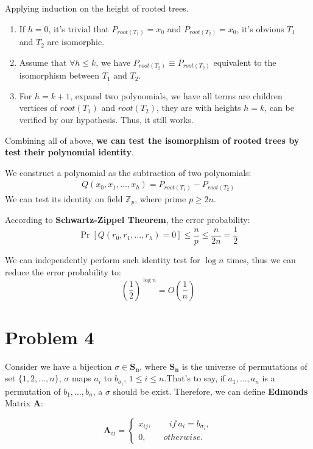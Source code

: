 \documentclass[a4paper, 12pt, titlepage]{article}
\begin{document}
Applying induction on the height of rooted trees.
\begin{enumerate}[1]
    \item If $h = 0$, it's trivial that $P_{root(T_{1})} = x_{0}$ and $P_{root(T_{2})} = x_{0}$, it's obvious $T_{1}$ and $T_{2}$ are isomorphic.
    \item Assume that $\forall h \leq k$, we have $P_{root(T_{2})} \equiv P_{root(T_{2})}$ equivalent to the isomorphism between $T_{1}$ and $T_{2}$.
    \item For $h = k + 1$, expand two polynomials, we have all terms are children vertices of $root(T_{1})$ and $root(T_{2})$, they are with heights $h = k$, can be verified by our hypothesis.
          Thus, it still works.
\end{enumerate}
Combining all of above, \textbf{we can test the isomorphism of rooted trees by test their polynomial identity}. 

We construct a polynomial as the subtraction of two polynomials:
\begin{equation}
    \begin{aligned}
        Q \left(x_{0}, x_{1}, \ldots, x_{h} \right) = P_{root(T_{1})} - P_{root(T_{2})}
    \end{aligned}
\end{equation}
We can test its identity on field $\mathbb{Z}_{p}$, where prime $p \geq 2n$.

According to \textbf{Schwartz-Zippel Theorem}, the error probability:
\[
    \Pr \left[ Q(r_{0}, r_{1}, \ldots, r_{h}) = 0 \right] \leq \frac{n}{p} \leq \frac{n}{2n} = \frac{1}{2}
\]        

We can independently perform such identity test for $\log{n}$ times, thus we can reduce the error probability to:
\[
    \left( \frac{1}{2} \right)^{\log{n}} = O \left( \frac{1}{n} \right)
\]

\section{Problem 4}
Consider we have a bijection $\sigma \in \mathbf{S_{n}}$, where $\mathbf{S_{n}}$ is the universe of permutations of set $\{1,2, \ldots, n\}$,
$\sigma$ maps $a_{i}$ to $b_{\sigma_{i}}$, $1 \leq i \leq n$.That's to say, if $a_{1}, \ldots, a_{n}$ is a permutation of 
$b_{1}, \ldots, b_{n}$, a $\sigma$ should be exist.
Therefore, we can define \textbf{Edmonds} Matrix \textbf{A}:

\[
    \mathbf{A}_{ij} = \begin{cases}
                x_{ij}, \qquad if\ a_{i} = b_{\sigma_{i}},\\
                0, \qquad otherwise.
             \end{cases}
\]
\end{document}
